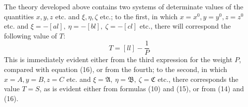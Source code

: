 The theory developed above contains two systems of determinate values of the quantities \(x,y,z\) etc. and \(\xi,\eta,\zeta\) etc.; to the first, in which \(x=x^0,y=y^0,z=z^0\) etc. and \(\xi=-[al],\ \eta=-[bl],\ \zeta=-[cl]\) etc., there will correspond the following value of \(T\):
\[
T=[ll]-\frac1P
\]
This is immediately evident either from the third expression for the weight \(P\), compared with equation (16), or from the fourth; to the second, in which \(x=A,y=B,z=C\) etc. and \(\xi=\mathfrak A,\ \eta=\mathfrak B,\ \zeta=\mathfrak C\) etc., there corresponds the value \(T=S\), as is evident either from formulas (10) and (15), or from (14) and (16).

\clearpage
